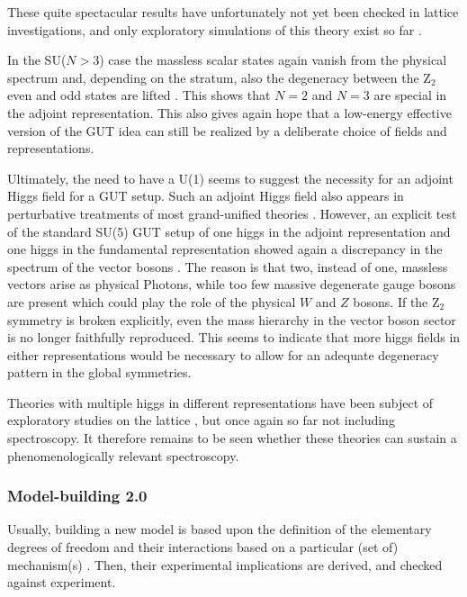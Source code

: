 \documentclass[final,12pt,3p,longtitle]{elsarticle}
\newcommand*{\1}{1\!\!\!\bot}
\begin{document}
These quite spectacular results have unfortunately not yet been checked in lattice investigations, and only exploratory simulations of this theory exist so far \cite{Gupta:1983zv,Kikugawa:1985ex}.

In the SU($N>3$) case the massless scalar states again vanish from the physical spectrum and, depending on the stratum, also the degeneracy between the Z$_2$ even and odd states are lifted \cite{Maas:2017xzh}. This shows that $N=2$ and $N=3$ are special in the adjoint representation. This also gives again hope that a low-energy effective version of the GUT idea can still be realized by a deliberate choice of fields and representations.

Ultimately, the need to have a U(1) seems to suggest the necessity for an adjoint Higgs field for a GUT setup. Such an adjoint Higgs field also appears in perturbative treatments of most grand-unified theories \cite{Bohm:2001yx,Langacker:1980js}. However, an explicit test of the standard SU(5) GUT setup of one higgs in the adjoint representation and one higgs in the fundamental representation \cite{Bohm:2001yx,Langacker:1980js} showed again a discrepancy in the spectrum of the vector bosons \cite{Maas:2017xzh}. The reason is that two, instead of one, massless vectors arise as physical Photons, while too few massive degenerate gauge bosons are present which could play the role of the physical $W$ and $Z$ bosons. If the Z$_2$ symmetry is broken explicitly, even the mass hierarchy in the vector boson sector is no longer faithfully reproduced. This seems to indicate that more higgs fields in either representations would be necessary to allow for an adequate degeneracy pattern in the global symmetries.

Theories with multiple higgs in different representations have been subject of exploratory studies on the lattice \cite{Greensite:2008ss}, but once again so far not including spectroscopy. It therefore remains to be seen whether these theories can sustain a phenomenologically relevant spectroscopy.

\subsubsection{Model-building 2.0}

Usually, building a new model is based upon the definition of the elementary degrees of freedom and their interactions based on a particular (set of) mechanism(s) \cite{Morrissey:2009tf}. Then, their experimental implications are derived, and checked against experiment. 
\end{document}
